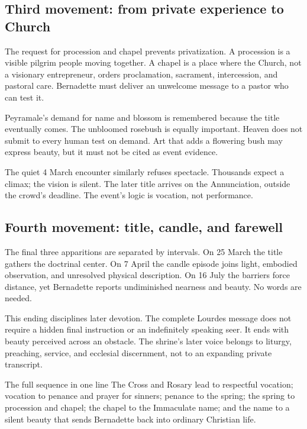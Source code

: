 \subsection{Third movement: from private experience to Church}

The request for procession and chapel prevents privatization. A procession is a visible pilgrim people moving together. A chapel is a place where the Church, not a visionary entrepreneur, orders proclamation, sacrament, intercession, and pastoral care. Bernadette must deliver an unwelcome message to a pastor who can test it.

Peyramale's demand for name and blossom is remembered because the title eventually comes. The unbloomed rosebush is equally important. Heaven does not submit to every human test on demand. Art that adds a flowering bush may express beauty, but it must not be cited as event evidence.

The quiet 4 March encounter similarly refuses spectacle. Thousands expect a climax; the vision is silent. The later title arrives on the Annunciation, outside the crowd's deadline. The event's logic is vocation, not performance.

\subsection{Fourth movement: title, candle, and farewell}

The final three apparitions are separated by intervals. On 25 March the title gathers the doctrinal center. On 7 April the candle episode joins light, embodied observation, and unresolved physical description. On 16 July the barriers force distance, yet Bernadette reports undiminished nearness and beauty. No words are needed.

This ending disciplines later devotion. The complete Lourdes message does not require a hidden final instruction or an indefinitely speaking seer. It ends with beauty perceived across an obstacle. The shrine's later voice belongs to liturgy, preaching, service, and ecclesial discernment, not to an expanding private transcript.

\begin{studybox}{The full sequence in one line}
The Cross and Rosary lead to respectful vocation; vocation to penance and prayer for sinners; penance to the spring; the spring to procession and chapel; the chapel to the Immaculate name; and the name to a silent beauty that sends Bernadette back into ordinary Christian life.
\end{studybox}
